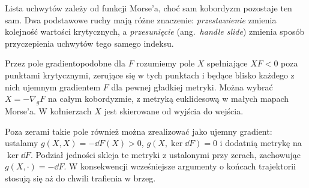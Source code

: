 Lista uchwytów zależy od funkcji Morse'a,
choć sam kobordyzm pozostaje ten sam.
Dwa podstawowe ruchy mają różne znaczenie:
\emph{przestawienie} zmienia kolejność
wartości krytycznych, a \emph{przesunięcie}
(ang.\ \emph{handle slide}) zmienia sposób
przyczepienia uchwytów tego samego indeksu.

\begin{definicja}
\label{def:pole-spadku-18}
Przez pole gradientopodobne dla $F$ rozumiemy pole $X$
spełniające $XF<0$ poza punktami krytycznymi,
zerujące się w tych punktach i będące blisko każdego
z nich ujemnym gradientem $F$ dla pewnej gładkiej metryki.
Można wybrać $X=-\nabla_g F$ na całym kobordyzmie,
z metryką euklidesową w małych mapach Morse'a.
W kołnierzach $X$ jest skierowane od wyjścia do wejścia.
\end{definicja}

Poza zerami takie pole również można zrealizować
jako ujemny gradient: ustalamy
$g(X,X)=-\dd F(X)>0$, $g(X,\ker\dd F)=0$
i dodatnią metrykę na $\ker\dd F$.
Podział jedności skleja te metryki z ustalonymi
przy zerach, zachowując $g(X,\cdot)=-\dd F$.
W konsekwencji wcześniejsze argumenty o końcach
trajektorii stosują się aż do chwili trafienia w brzeg.

